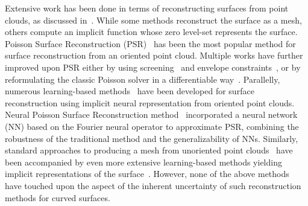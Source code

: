 Extensive work has been done in terms of reconstructing surfaces from point clouds, as discussed in~\cite{SurveyReconPC1, SurveyReconPC2}. While some methods reconstruct the surface as a mesh, others compute an implicit function whose zero level-set represents the surface. Poisson Surface Reconstruction (PSR)~\cite{PSR} has been the most popular method for surface reconstruction from an oriented point cloud. Multiple works have further improved upon PSR either by using screening~\cite{ScreenedPSR} and envelope constraints~\cite{PSREnv}, or by reformulating the classic Poisson solver in a differentiable way~\cite{DiffPSR}. Parallelly, numerous learning-based methods~\cite{IGR, SIREN, IDF} have been developed for surface reconstruction using implicit neural representation from oriented point clouds. Neural Poisson Surface Reconstruction method~\cite{nPSR} incorporated a neural network (NN) based on the Fourier neural operator to approximate PSR, combining the robustness of the traditional method and the generalizability of NNs. Similarly, standard approaches to producing a mesh from unoriented point clouds~\cite{iPSR, ParamGauss} have been accompanied by even more extensive learning-based methods yielding implicit representations of the surface~\cite{SAL, PredPrior, SparseSurf, POCO, P2Surf, DiGS, SALD, NeuralHessian}. However, none of the above methods have touched upon the aspect of the inherent uncertainty of such reconstruction methods for curved surfaces.
\newline

